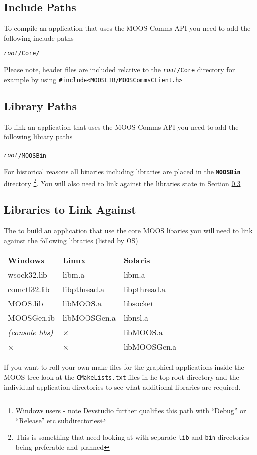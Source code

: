 \documentclass[a4paper,10pt]{article}
\newcommand{\Code}[1]{\texttt{#1} }
\newcommand{\code}[1]{\Code{#1} }
\begin{document}
\subsection{Include Paths}
To compile an application that uses the MOOS Comms API you need to
add the following include paths

\begin{center}
\begin{description}
\item \code{\textit{root}/Core/}
\end{description}
\end{center}
Please note, header files are included relative to the
\code{\textit{root}/Core} directory for example by using \verb!#include<MOOSLIB/MOOSCommsCLient.h>!

\subsection{Library Paths}
To link an application that uses the MOOS Comms API you need to
add the following library paths
\begin{description}
\item \code{\textit{root}/MOOSBin} \footnote{Windows users - note Devstudio further qualifies this path with ``Debug'' or ``Release'' etc subdirectories}
\end{description}
For historical reasons all binaries including libraries are placed
in the \code{\textbf{MOOSBin}} directory \footnote{This is something that need
looking at  with separate \code{lib} and \code{bin} directories being preferable and
planned}. You will also need to link against the libraries state
in Section \ref{Sec:Libs}

\subsection{Libraries to Link Against}\label{Sec:Libs}
The to build an application that use the core MOOS libaries you will need to link against the following libraries (listed by OS)
\begin{center}
\begin{tabular}{lll}
\textbf{Windows} & \textbf{Linux} & \textbf{Solaris} \\ 
wsock32.lib & libm.a & libm.a \\ 
comctl32.lib & libpthread.a & libpthread.a \\ 
MOOS.lib & libMOOS.a & libsocket \\ 
MOOSGen.ib & libMOOSGen.a & libnsl.a \\ 
\textit{(console libs)} & × & libMOOS.a \\ 
× & × & libMOOSGen.a
\end{tabular}
\end{center}

If you want to roll your own make files for the graphical applications inside the MOOS tree look at the \code{CMakeLists.txt} files in he top root directory and the individual application directories to see what additional libraries are required.
\end{document}

